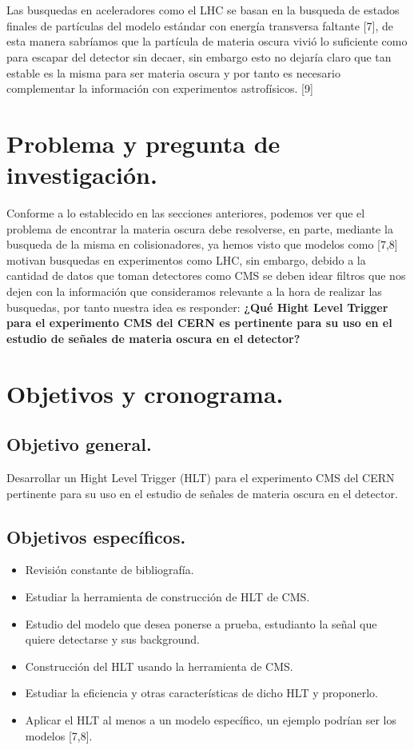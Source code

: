 \\
\\
Las busquedas en aceleradores como el LHC se basan en la busqueda de estados finales de partículas del modelo estándar con energía transversa faltante [7], de esta manera sabríamos que la partícula de materia oscura vivió lo suficiente como para escapar del detector sin decaer, sin embargo esto no dejaría claro que tan estable es la misma para ser materia oscura y por tanto es necesario complementar la información con experimentos astrofísicos. [9]
\newpage
\section{Problema y pregunta de investigación.}

	Conforme a lo establecido en las secciones anteriores, podemos ver que el problema de encontrar la materia oscura debe resolverse, en parte, mediante la busqueda de la misma en colisionadores, ya hemos visto que modelos como [7,8] motivan busquedas en experimentos como LHC, sin embargo, debido a la cantidad de datos que toman detectores como CMS se deben idear filtros que nos dejen con la información que consideramos relevante a la hora de realizar las busquedas, por tanto nuestra idea es responder: \textbf{¿Qué Hight Level Trigger para el experimento CMS del CERN es pertinente para su uso en el estudio de señales de materia oscura en el detector?}


\newpage
\section{Objetivos y cronograma.}


\subsection{Objetivo general.}

Desarrollar un Hight Level Trigger (HLT) para el experimento CMS del CERN pertinente para su uso en el estudio de señales de materia oscura en el detector.

\subsection{Objetivos específicos.}

\begin{itemize}
	\item Revisión constante de bibliografía.
	\item Estudiar la herramienta de construcción de HLT de CMS.
	\item Estudio del modelo que desea ponerse a prueba, estudianto la señal que quiere detectarse y sus background.
	\item Construcción del HLT usando la herramienta de CMS.
	\item Estudiar la eficiencia y otras características de dicho HLT y proponerlo.
	\item Aplicar el HLT al menos a un modelo específico, un ejemplo podrían ser los modelos [7,8].
\end{itemize}


